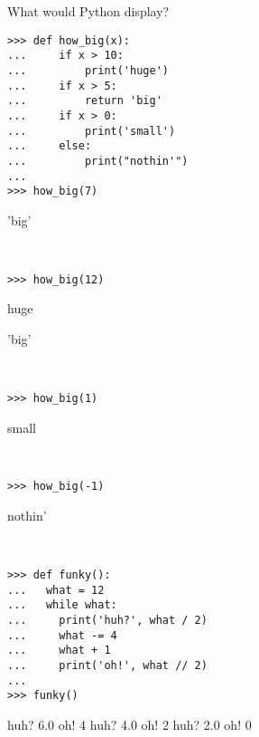 \question What would Python display?
\begin{lstlisting}
>>> def how_big(x):
...     if x > 10:
...         print('huge')
...     if x > 5:
...         return 'big'
...     if x > 0:
...         print('small')
...     else:
...         print("nothin'")
... 
>>> how_big(7) 
\end{lstlisting} 
\begin{solution}
'big'
\end{solution}
\begin{lstlisting}


>>> how_big(12)
\end{lstlisting} 
\begin{solution}

huge

'big'
\end{solution}
\begin{lstlisting}


>>> how_big(1) 
\end{lstlisting} 
\begin{solution}
small
\end{solution}
\begin{lstlisting}


>>> how_big(-1)
\end{lstlisting}
\begin{solution}
nothin'
\end{solution}
\begin{lstlisting}


>>> def funky():
...   what = 12
...   while what:
...     print('huh?', what / 2)
...     what -= 4
...     what + 1
...     print('oh!', what // 2)
...
>>> funky()
\end{lstlisting}
\begin{solution}
huh? 6.0
oh! 4
huh? 4.0
oh! 2
huh? 2.0
oh! 0
\end{solution}

